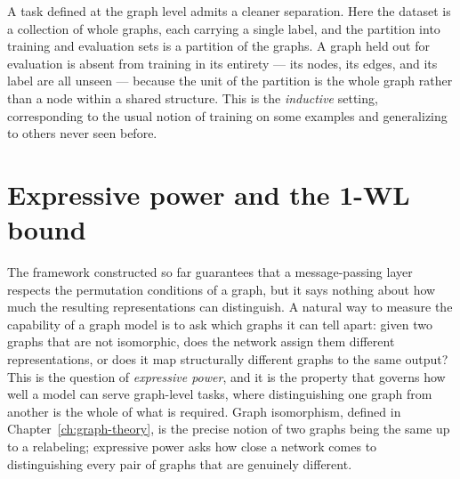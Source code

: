 A task defined at the graph level admits a cleaner separation. Here the dataset
is a collection of whole graphs, each carrying a single label, and the
partition into training and evaluation sets is a partition of the graphs. A
graph held out for evaluation is absent from training in its entirety --- its
nodes, its edges, and its label are all unseen --- because the unit of the
partition is the whole graph rather than a node within a shared structure.
This is the \textit{inductive} setting, corresponding to the usual notion of
training on some examples and generalizing to others never seen before.
 
\section{Expressive power and the 1-WL bound}
\label{sec:expressive-power}
 
The framework constructed so far guarantees that a message-passing layer
respects the permutation conditions of a graph, but it says nothing about how much 
the resulting representations can distinguish. A natural way to measure the
capability of a graph model is to ask which graphs it can tell apart: given two
graphs that are not isomorphic, does the network assign them different
representations, or does it map structurally different graphs to the same
output? This is the question of \textit{expressive power}, and it is the
property that governs how well a model can serve graph-level tasks, where
distinguishing one graph from another is the whole of what is required. Graph
isomorphism, defined in Chapter~\ref{ch:graph-theory}, is the precise notion of
two graphs being the same up to a relabeling; expressive power asks how close a
network comes to distinguishing every pair of graphs that are genuinely
different.
 
